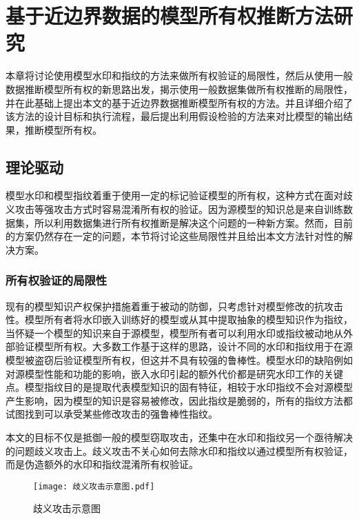 
\chapter{基于近边界数据的模型所有权推断方法研究}\label{4}

本章将讨论使用模型水印和指纹的方法来做所有权验证的局限性，然后从使用一般数据推断模型所有权的新思路出发，揭示使用一般数据集做所有权推断的局限性，并在此基础上提出本文的基于近边界数据推断模型所有权的方法。并且详细介绍了该方法的设计目标和执行流程，最后提出利用假设检验的方法来对比模型的输出结果，推断模型所有权。

\section{理论驱动}\label{4.1}

模型水印和模型指纹着重于使用一定的标记验证模型的所有权，这种方式在面对歧义攻击等强攻击方式时容易混淆所有权的验证。因为源模型的知识总是来自训练数据集，所以利用数据集进行所有权推断是解决这个问题的一种新方案。然而，目前的方案仍然存在一定的问题，本节将讨论这些局限性并且给出本文方法针对性的解决方案。

\subsection{所有权验证的局限性}

现有的模型知识产权保护措施着重于被动的防御，只考虑针对模型修改的抗攻击性。模型所有者将水印嵌入训练好的模型或从其中提取抽象的模型知识作为指纹，当怀疑一个模型的知识来自于源模型，模型所有者可以利用水印或指纹被动地从外部验证模型所有权。大多数工作基于这样的思路，设计不同的水印和指纹用于在源模型被盗窃后验证模型所有权，但这并不具有较强的鲁棒性。模型水印的缺陷例如对源模型性能和功能的影响，嵌入水印引起的额外代价都是研究水印工作的关键点。模型指纹目的是提取代表模型知识的固有特征，相较于水印指纹不会对源模型产生影响，因为模型的知识是容易被修改，因此指纹是脆弱的，所有的指纹方法都试图找到可以承受某些修改攻击的强鲁棒性指纹。

本文的目标不仅是抵御一般的模型窃取攻击，还集中在水印和指纹另一个亟待解决的问题歧义攻击上。歧义攻击不关心如何去除水印和指纹以通过模型所有权验证，而是伪造额外的水印和指纹混淆所有权验证。

\begin{figure}[htbp]%
	\centering
	\setlength{\abovecaptionskip}{2mm} %
	\vspace{-2mm}
	\setlength{\belowcaptionskip}{-3mm} %
	\texttt{[image: 歧义攻击示意图.pdf]}
	\caption{歧义攻击示意图}
	\label{歧义攻击示意图}
	\end {figure}	

